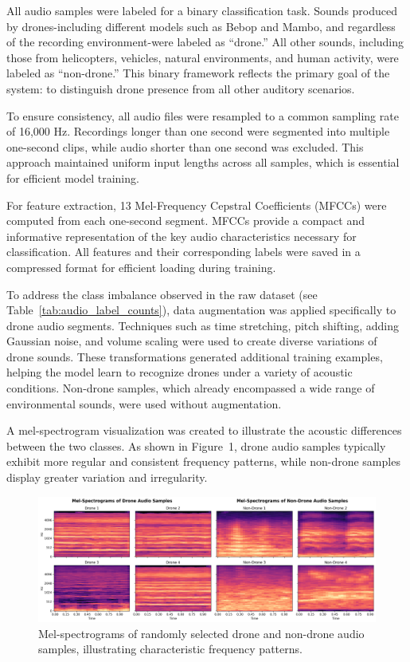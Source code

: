 \documentclass[12pt]{article}
\begin{document}
{\fontsize{9}{11}\selectfont
\indent All audio samples were labeled for a binary classification task. Sounds produced by drones-including different models such as Bebop and Mambo, and regardless of the recording environment-were labeled as “drone.” All other sounds, including those from helicopters, vehicles, natural environments, and human activity, were labeled as “non-drone.” This binary framework reflects the primary goal of the system: to distinguish drone presence from all other auditory scenarios.

To ensure consistency, all audio files were resampled to a common sampling rate of 16,000 Hz. Recordings longer than one second were segmented into multiple one-second clips, while audio shorter than one second was excluded. This approach maintained uniform input lengths across all samples, which is essential for efficient model training.

For feature extraction, 13 Mel-Frequency Cepstral Coefficients (MFCCs) were computed from each one-second segment. MFCCs provide a compact and informative representation of the key audio characteristics necessary for classification. All features and their corresponding labels were saved in a compressed format for efficient loading during training.

To address the class imbalance observed in the raw dataset (see Table~\ref{tab:audio_label_counts}), data augmentation was applied specifically to drone audio segments. Techniques such as time stretching, pitch shifting, adding Gaussian noise, and volume scaling were used to create diverse variations of drone sounds. These transformations generated additional training examples, helping the model learn to recognize drones under a variety of acoustic conditions. Non-drone samples, which already encompassed a wide range of environmental sounds, were used without augmentation.

A mel-spectrogram visualization was created to illustrate the acoustic differences between the two classes. As shown in Figure~1, drone audio samples typically exhibit more regular and consistent frequency patterns, while non-drone samples display greater variation and irregularity.


\begin{figure}[ht]
\centering
\includegraphics[width=\linewidth]{mel_spectrogram_comparison.png}
\caption{Mel-spectrograms of randomly selected drone and non-drone audio samples, illustrating characteristic frequency patterns.}
\label{fig:mel_spectrograms}
\end{figure}

}
\end{document}
